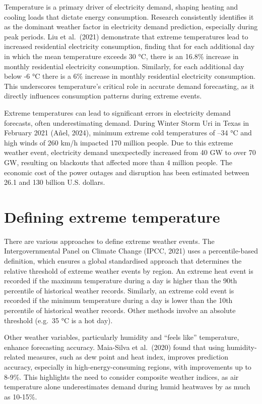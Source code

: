 \documentclass[mstat,12pt,a4paper]{unswthesis}
\begin{document}
Temperature is a primary driver of electricity demand, shaping heating
and cooling loads that dictate energy consumption. Research consistently
identifies it as the dominant weather factor in electricity demand
prediction, especially during peak periods. Liu et al.~(2021)
demonstrate that extreme temperatures lead to increased residential
electricity consumption, finding that for each additional day in which
the mean temperature exceeds 30 °C, there is an 16.8\% increase in
monthly residential electricity consumption. Similarly, for each
additional day below -6 °C there is a 6\% increase in monthly
residential electricity consumption. This underscores temperature's
critical role in accurate demand forecasting, as it directly influences
consumption patterns during extreme events.

\bigskip

Extreme temperatures can lead to significant errors in electricity
demand forecasts, often underestimating demand. During Winter Storm Uri
in Texas in February 2021 (Añel, 2024), minimum extreme cold
temperatures of --34 °C and high winds of 260 km/h impacted 170 million
people. Due to this extreme weather event, electricity demand
unexpectedly increased from 40 GW to over 70 GW, resulting on blackouts
that affected more than 4 million people. The economic cost of the power
outages and disruption has been estimated between 26.1 and 130 billion
U.S. dollars.

\section{Defining extreme
temperature}\label{defining-extreme-temperature}

There are various approaches to define extreme weather events. The
Intergovernmental Panel on Climate Change (IPCC, 2021) uses a
percentile-based definition, which ensures a global standardised
approach that determines the relative threshold of extreme weather
events by region. An extreme heat event is recorded if the maximum
temperature during a day is higher than the 90th percentile of
historical weather records. Similarly, an extreme cold event is recorded
if the minimum temperature during a day is lower than the 10th
percentile of historical weather records. Other methods involve an
absolute threshold (e.g.~35 °C is a hot day).

\bigskip

Other weather variables, particularly humidity and ``feels like''
temperature, enhance forecasting accuracy. Maia-Silva et al.~(2020)
found that using humidity-related measures, such as dew point and heat
index, improves prediction accuracy, especially in high-energy-consuming
regions, with improvements up to 8-9\%. This highlights the need to
consider composite weather indices, as air temperature alone
underestimates demand during humid heatwaves by as much as 10-15\%.
\end{document}
